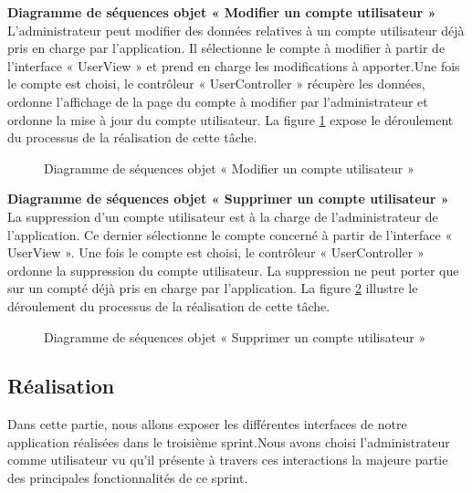 \textbf{Diagramme de séquences objet « Modifier un compte utilisateur »}\\
L’administrateur peut modifier des données relatives à un compte utilisateur déjà pris en charge par l’application. Il sélectionne le compte à modifier à partir de l’interface « UserView » et prend en charge les modifications à apporter.\newline Une fois le compte est choisi, le contrôleur « UserController » récupère les données, ordonne l’affichage de la page du compte à modifier par l’administrateur et ordonne la mise à jour du compte utilisateur.\newline
La figure \ref{fig:SeqObjetModifierUtilisateur} expose le déroulement du processus de la réalisation de cette tâche.
\newpage
    \begin{figure}[htpb]
    \centering
    \caption{Diagramme de séquences objet « Modifier un compte utilisateur »}
    \label{fig:SeqObjetModifierUtilisateur}
    \end{figure}
\textbf{Diagramme de séquences objet « Supprimer un compte utilisateur »}\\
La suppression d’un compte utilisateur est à la charge de l’administrateur de l’application. Ce dernier sélectionne le compte concerné à partir de l’interface « UserView ». Une fois le compte est choisi, le contrôleur « UserController » ordonne la suppression du compte utilisateur.\newline
La suppression ne peut porter que sur un compté déjà pris en charge par l’application.\newline
La figure \ref{fig:seqobjetsupprimerUtilisateur} illustre le déroulement du processus de la réalisation de cette tâche.
\newpage
 \begin{figure}[htpb]
    \centering
    \caption{Diagramme de séquences objet « Supprimer un compte utilisateur »}
    \label{fig:seqobjetsupprimerUtilisateur}
    \end{figure}



\subsection{Réalisation}
Dans cette partie, nous allons exposer les différentes interfaces de notre application réalisées dans
le troisième sprint.\newline Nous avons choisi l’administrateur comme utilisateur vu qu’il présente à travers ces interactions la majeure partie des principales fonctionnalités de ce sprint.

